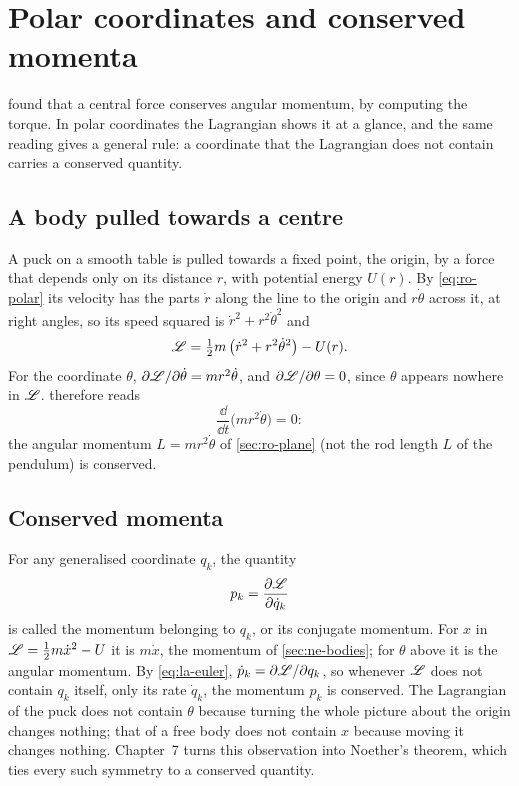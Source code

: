 \section{Polar coordinates and conserved momenta}
\label{sec:la-polar}

 found that a central force conserves angular
momentum, by computing the torque. In polar coordinates the Lagrangian
shows it at a glance, and the same reading gives a general rule: a
coordinate that the Lagrangian does not contain carries a conserved
quantity.

\subsection*{A body pulled towards a centre}

A puck on a smooth table is pulled towards a fixed point, the origin, by a
force that depends only on its distance $r$, with potential energy $U(r)$.
By \cref{eq:ro-polar} its velocity has the parts $\dot{r}$ along the line
to the origin and $r\dot\theta$ across it, at right angles, so its speed
squared is $\dot{r}^2 + r^2\dot\theta^2$ and
\begin{equation*}
   \mathscr{L} = \tfrac12 m\,\bigl(\dot{r}^2 + r^2\dot\theta^2\bigr) - U(r) .
\end{equation*}
For the coordinate $\theta$, $\partial\mathscr{L}/\partial\dot\theta =
mr^2\dot\theta$, and $\partial\mathscr{L}/\partial\theta = 0$, since $\theta$
appears nowhere in $\mathscr{L}$.  therefore reads
\begin{equation*}
   \frac{\dd}{\dd t}\bigl(mr^2\dot\theta\bigr) = 0 :
\end{equation*}
the angular momentum $L = mr^2\dot\theta$ of \cref{sec:ro-plane} (not
the rod length $L$ of the pendulum) is conserved.

\subsection*{Conserved momenta}

For any generalised coordinate $q_k$, the quantity
\begin{equation}
   p_k = \frac{\partial\mathscr{L}}{\partial\dot{q}_k}
   \label{eq:la-momentum}
\end{equation}
is called the momentum belonging to $q_k$, or its conjugate momentum. For
$x$ in $\mathscr{L} = \frac12 m\dot{x}^2 - U$ it is $m\dot{x}$, the momentum of
\cref{sec:ne-bodies}; for $\theta$ above it is the angular momentum. By
\cref{eq:la-euler}, $\dot{p}_k = \partial\mathscr{L}/\partial q_k$, so whenever
$\mathscr{L}$ does not contain $q_k$ itself, only its rate $\dot{q}_k$, the
momentum $p_k$ is conserved. The Lagrangian of the puck does not contain
$\theta$ because turning the whole picture about the origin changes
nothing; that of a free body does not contain $x$ because moving it
changes nothing. Chapter~7 turns this observation into Noether's theorem,
which ties every such symmetry to a conserved quantity.

